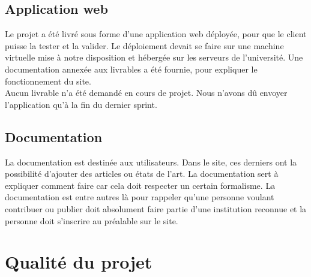 \documentclass[t, 12pt, usenames,dvipsnames]{article}
\begin{document}
        \subsection{Application web}
            \noindent Le projet a été livré sous forme d'une application web déployée, pour que le client puisse la tester et la valider. Le déploiement devait se faire sur une machine virtuelle mise à notre disposition et hébergée sur les serveurs de l'université. Une documentation annexée aux livrables a été fournie, pour expliquer le fonctionnement du site.\\
            Aucun livrable n'a été demandé en cours de projet. Nous n'avons dû envoyer l'application qu'à la fin du dernier sprint.
        
        \subsection{Documentation}
            \noindent La documentation est destinée aux utilisateurs. Dans le site, ces derniers ont la possibilité d'ajouter des articles ou états de l'art. La documentation sert à expliquer comment faire car cela doit respecter un certain formalisme. La documentation est entre autres là pour rappeler qu'une personne voulant contribuer ou publier doit absolument faire partie d'une institution reconnue et la personne doit s'inscrire au préalable sur le site.

    \newpage
    \section{Qualité du projet}
        
\end{document}
